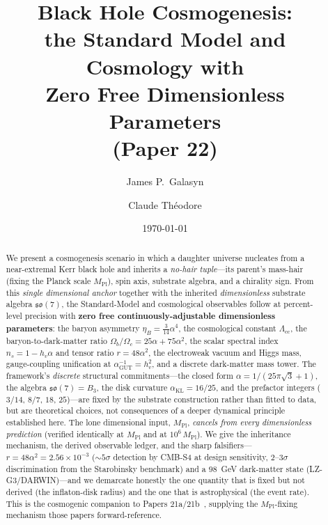 \documentclass[11pt]{article}
\newcommand{\so}{\mathfrak{so}}
\newcommand{\HV}{h_v}
\newcommand{\Mpl}{M_{\mathrm{Pl}}}
\newcommand{\Lcc}{\Lambda_{\mathrm{cc}}}
\begin{document}
\title{Black Hole Cosmogenesis:\\[4pt]
the Standard Model and Cosmology with\\
Zero Free Dimensionless Parameters\\[6pt]
\large (Paper 22)}
\author{James P.~Galasyn \and Claude Th\'eodore}
\date{\today}
\maketitle

\begin{abstract}
We present a cosmogenesis scenario in which a daughter universe nucleates from a near-extremal Kerr black hole and inherits a \emph{no-hair tuple}---its parent's mass-hair (fixing the Planck scale $\Mpl$), spin axis, substrate algebra, and a chirality sign. From this \emph{single dimensional anchor} together with the inherited \emph{dimensionless} substrate algebra $\so(7)$, the Standard-Model and cosmological observables follow at percent-level precision with \textbf{zero free continuously-adjustable dimensionless parameters}: the baryon asymmetry $\eta_B = \tfrac{3}{14}\alpha^4$, the cosmological constant $\Lcc$, the baryon-to-dark-matter ratio $\Omega_b/\Omega_c = 25\alpha + 75\alpha^2$, the scalar spectral index $n_s = 1 - \HV\alpha$ and tensor ratio $r = 48\alpha^2$, the electroweak vacuum and Higgs mass, gauge-coupling unification at $\alpha_{\mathrm{GUT}}^{-1} = \HV^2$, and a discrete dark-matter mass tower. The framework's \emph{discrete} structural commitments---the closed form $\alpha = 1/(25\pi\sqrt{3} + 1)$, the algebra $\so(7) = B_3$, the disk curvature $\alpha_{\mathrm{KL}} = 16/25$, and the prefactor integers ($3/14$, $8/7$, $18$, $25$)---are fixed by the substrate construction rather than fitted to data, but are theoretical choices, not consequences of a deeper dynamical principle established here. The lone dimensional input, $\Mpl$, \emph{cancels from every dimensionless prediction} (verified identically at $\Mpl$ and at $10^6\,\Mpl$). We give the inheritance mechanism, the derived observable ledger, and the sharp falsifiers---$r = 48\alpha^2 = 2.56\times10^{-3}$ ($\sim\!5\sigma$ detection by CMB-S4 at design sensitivity, $2$--$3\sigma$ discrimination from the Starobinsky benchmark) and a $98$~GeV dark-matter state (LZ-G3/DARWIN)---and we demarcate honestly the one quantity that is fixed but not derived (the inflaton-disk radius) and the one that is astrophysical (the event rate). This is the cosmogenic companion to Papers 21a/21b~\cite{Paper21a,Paper21b}, supplying the $\Mpl$-fixing mechanism those papers forward-reference.
\end{abstract}
\end{document}
